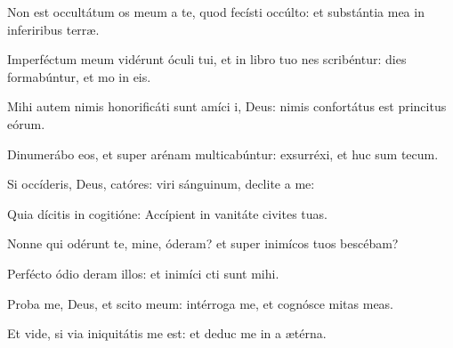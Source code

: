 \item Non est occultátum os meum a te, quod fecísti  occúlto:\psstar{} et substántia mea in inferiribus terræ.

\item Imperféctum meum vidérunt óculi tui,\pscross{} et in libro tuo nes scribéntur:\psstar{} dies formabúntur, et mo in eis.

\item Mihi autem nimis honorificáti sunt amíci i, Deus:\psstar{} nimis confortátus est princitus eórum.

\item Dinumerábo eos, et super arénam multicabúntur:\psstar{} exsurréxi, et huc sum tecum.

\item Si occíderis, Deus, catóres:\psstar{} viri sánguinum, declite a me:

\item Quia dícitis in cogitióne:\psstar{} Accípient in vanitáte civites tuas.

\item Nonne qui odérunt te, mine, óderam?\psstar{} et super inimícos tuos bescébam?

\item Perfécto ódio deram illos:\psstar{} et inimíci cti sunt mihi.

\item Proba me, Deus, et scito  meum:\psstar{} intérroga me, et cognósce mitas meas.

\item Et vide, si via iniquitátis  me est:\psstar{} et deduc me in a ætérna.
